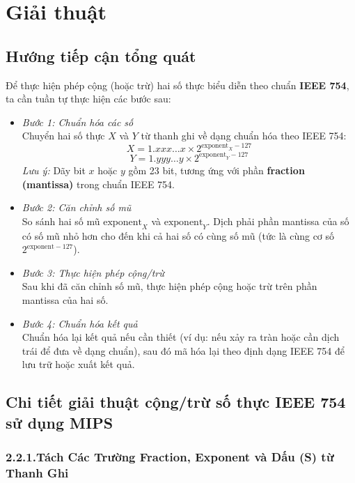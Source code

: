 \section{Giải thuật}
\subsection{Hướng tiếp cận tổng quát}

Để thực hiện phép cộng (hoặc trừ) hai số thực biểu diễn theo chuẩn \textbf{IEEE 754}, ta cần tuần tự thực hiện các bước sau:

\begin{itemize}
    \item \textit{Bước 1: Chuẩn hóa các số} \\
    Chuyển hai số thực $X$ và $Y$ từ thanh ghi về dạng chuẩn hóa theo IEEE 754:
    \[
        X = 1.xxx\ldots x \times 2^{\text{exponent}_X - 127} \tag{1}
    \]
    \[
        Y = 1.yyy\ldots y \times 2^{\text{exponent}_Y - 127} \tag{2}
    \]
    \textit{Lưu ý:} Dãy bit $x$ hoặc $y$ gồm 23 bit, tương ứng với phần \textbf{fraction (mantissa)} trong chuẩn IEEE 754.

    \item \textit{Bước 2: Căn chỉnh số mũ} \\
    So sánh hai số mũ $\text{exponent}_X$ và $\text{exponent}_Y$. Dịch phải phần mantissa của số có số mũ nhỏ hơn cho đến khi cả hai số có cùng số mũ (tức là cùng cơ số $2^{\text{exponent} - 127}$).

    \item \textit{Bước 3: Thực hiện phép cộng/trừ} \\
    Sau khi đã căn chỉnh số mũ, thực hiện phép cộng hoặc trừ trên phần mantissa của hai số.

    \item \textit{Bước 4: Chuẩn hóa kết quả} \\
    Chuẩn hóa lại kết quả nếu cần thiết (ví dụ: nếu xảy ra tràn hoặc cần dịch trái để đưa về dạng chuẩn), sau đó mã hóa lại theo định dạng IEEE 754 để lưu trữ hoặc xuất kết quả.
\end{itemize}



\subsection{Chi tiết giải thuật cộng/trừ số thực IEEE 754 sử dụng MIPS}
\subsubsection*{2.2.1.Tách Các Trường Fraction, Exponent và Dấu (S) từ Thanh Ghi}

